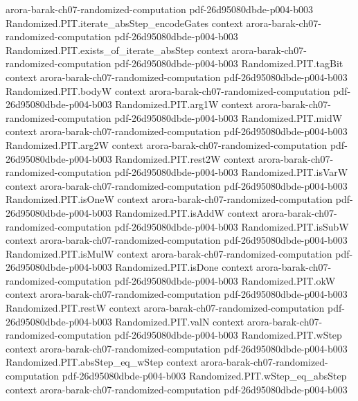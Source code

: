 \begin{theorem}
  {arora-barak-ch07-randomized-computation}
  {pdf-26d95080dbde-p004-b003}
\proofstep
  {Randomized.PIT.iterate_absStep_encodeGates}
  {context}
  {arora-barak-ch07-randomized-computation}
  {pdf-26d95080dbde-p004-b003}
\proofstep
  {Randomized.PIT.exists_of_iterate_absStep}
  {context}
  {arora-barak-ch07-randomized-computation}
  {pdf-26d95080dbde-p004-b003}
\proofstep
  {Randomized.PIT.tagBit}
  {context}
  {arora-barak-ch07-randomized-computation}
  {pdf-26d95080dbde-p004-b003}
\proofstep
  {Randomized.PIT.bodyW}
  {context}
  {arora-barak-ch07-randomized-computation}
  {pdf-26d95080dbde-p004-b003}
\proofstep
  {Randomized.PIT.arg1W}
  {context}
  {arora-barak-ch07-randomized-computation}
  {pdf-26d95080dbde-p004-b003}
\proofstep
  {Randomized.PIT.midW}
  {context}
  {arora-barak-ch07-randomized-computation}
  {pdf-26d95080dbde-p004-b003}
\proofstep
  {Randomized.PIT.arg2W}
  {context}
  {arora-barak-ch07-randomized-computation}
  {pdf-26d95080dbde-p004-b003}
\proofstep
  {Randomized.PIT.rest2W}
  {context}
  {arora-barak-ch07-randomized-computation}
  {pdf-26d95080dbde-p004-b003}
\proofstep
  {Randomized.PIT.isVarW}
  {context}
  {arora-barak-ch07-randomized-computation}
  {pdf-26d95080dbde-p004-b003}
\proofstep
  {Randomized.PIT.isOneW}
  {context}
  {arora-barak-ch07-randomized-computation}
  {pdf-26d95080dbde-p004-b003}
\proofstep
  {Randomized.PIT.isAddW}
  {context}
  {arora-barak-ch07-randomized-computation}
  {pdf-26d95080dbde-p004-b003}
\proofstep
  {Randomized.PIT.isSubW}
  {context}
  {arora-barak-ch07-randomized-computation}
  {pdf-26d95080dbde-p004-b003}
\proofstep
  {Randomized.PIT.isMulW}
  {context}
  {arora-barak-ch07-randomized-computation}
  {pdf-26d95080dbde-p004-b003}
\proofstep
  {Randomized.PIT.isDone}
  {context}
  {arora-barak-ch07-randomized-computation}
  {pdf-26d95080dbde-p004-b003}
\proofstep
  {Randomized.PIT.okW}
  {context}
  {arora-barak-ch07-randomized-computation}
  {pdf-26d95080dbde-p004-b003}
\proofstep
  {Randomized.PIT.restW}
  {context}
  {arora-barak-ch07-randomized-computation}
  {pdf-26d95080dbde-p004-b003}
\proofstep
  {Randomized.PIT.valN}
  {context}
  {arora-barak-ch07-randomized-computation}
  {pdf-26d95080dbde-p004-b003}
\proofstep
  {Randomized.PIT.wStep}
  {context}
  {arora-barak-ch07-randomized-computation}
  {pdf-26d95080dbde-p004-b003}
\proofstep
  {Randomized.PIT.absStep_eq_wStep}
  {context}
  {arora-barak-ch07-randomized-computation}
  {pdf-26d95080dbde-p004-b003}
\proofstep
  {Randomized.PIT.wStep_eq_absStep}
  {context}
  {arora-barak-ch07-randomized-computation}
  {pdf-26d95080dbde-p004-b003}

\end{theorem}
